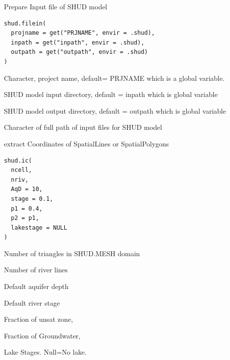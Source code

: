 \documentclass[a4paper]{book}
\begin{document}
%
\begin{Description}\relax
Prepare Input file of SHUD model
\end{Description}
%
\begin{Usage}
\begin{verbatim}
shud.filein(
  projname = get("PRJNAME", envir = .shud),
  inpath = get("inpath", envir = .shud),
  outpath = get("outpath", envir = .shud)
)
\end{verbatim}
\end{Usage}
%
\begin{Arguments}
\begin{ldescription}
\item[\code{projname}] Character, project name, default= PRJNAME which is a global variable.

\item[\code{inpath}] SHUD model input directory, default = inpath which is global variable

\item[\code{outpath}] SHUD model output directory, default = outpath which is global variable
\end{ldescription}
\end{Arguments}
%
\begin{Value}
Character of full path of input files for SHUD model
\end{Value}
%
\begin{Description}\relax
extract Coordinates of SpatialLines or  SpatialPolygons
\end{Description}
%
\begin{Usage}
\begin{verbatim}
shud.ic(
  ncell,
  nriv,
  AqD = 10,
  stage = 0.1,
  p1 = 0.4,
  p2 = p1,
  lakestage = NULL
)
\end{verbatim}
\end{Usage}
%
\begin{Arguments}
\begin{ldescription}
\item[\code{ncell}] Number of triangles in SHUD.MESH domain

\item[\code{nriv}] Number of river lines

\item[\code{AqD}] Default aquifer depth

\item[\code{stage}] Default river stage

\item[\code{p1}] Fraction of unsat zone, 

\item[\code{p2}] Fraction of Groundwater, 

\item[\code{lakestage}] Lake Stages. Null=No lake.
\end{ldescription}
\end{Arguments}
\end{document}
